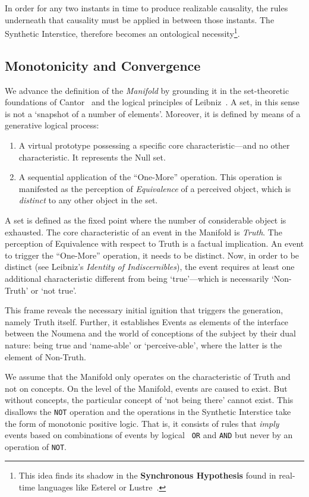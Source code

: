 \documentclass[11pt, a4paper]{article}
\theoremstyle{formalism}
\begin{document}
{In order for any two instants in time to produce realizable causality, the
rules underneath that causality must be applied in between those instants.
The Synthetic Interstice, therefore becomes an ontological necessity\footnote{This
idea finds its shadow in the \textbf{Synchronous Hypothesis} found in real-time
languages like Esterel or Lustre~\cite{Benveniste1991}.}. 

\subsection{Monotonicity and Convergence}

We advance the definition of the \textit{Manifold} by grounding it in the
set-theoretic foundations of Cantor~\cite{Cantor1895} and the logical
principles of Leibniz~\cite{Leibniz1714}. A set, in this sense is not a
`snapshot of a number of elements'. Moreover, it is defined by means of 
a generative logical process:

\begin{enumerate}
    \item A virtual prototype possessing a specific core characteristic---and 
          no other characteristic. It represents the Null set. 
    \item A sequential application of the ``One-More'' operation. This operation
          is manifested as the perception of {\it Equivalence\/} of a perceived
          object, which is {\it distinct\/} to any other object in the set.
\end{enumerate}

A set is defined as the fixed point where the number of considerable object is
exhausted. The core characteristic of an event in the Manifold is {\it Truth}.
The perception of Equivalence with respect to Truth is a factual implication.
An event to trigger the ``One-More'' operation, it needs to be distinct. Now,
in order to be distinct (see Leibniz's \textit{Identity of Indiscernibles}),
the event requires at least one additional characteristic different from being
`true'---which is necessarily `Non-Truth' or `not true'.

This frame reveals the necessary initial ignition that triggers the generation,
namely Truth itself. Further, it establishes Events as elements of the interface
between the Noumena and the world of conceptions of the subject by their dual
nature: being true and `name-able' or `perceive-able', where the latter is the
element of Non-Truth.

We assume that the Manifold only operates on the characteristic of Truth and
not on concepts. On the level of the Manifold, events are caused to exist. But
without concepts, the particular concept of `not being there' cannot exist.
This disallows the {\tt NOT} operation and the operations in the Synthetic
Interstice take the form of monotonic positive logic. That is, it consists of
rules that {\it imply\/} events based on combinations of events by logical {\tt
OR} and {\tt AND} but never by an operation of {\tt NOT}. 

}
\end{document}

